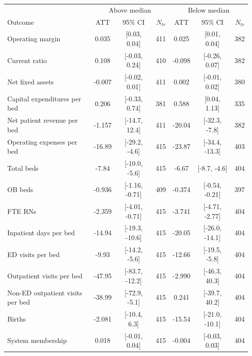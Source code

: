 \begin{tabular}{lccrccr}
 & \multicolumn{3}{c}{Above median} & \multicolumn{3}{c}{Below median} \\
Outcome & ATT & 95\% CI & $N_{tr}$ & ATT & 95\% CI & $N_{tr}$ \\
Operating margin & 0.035 & [0.03, 0.04] & 411 & 0.025 & [0.01, 0.04] & 382 \\
Current ratio & 0.108 & [-0.03, 0.24] & 410 & -0.098 & [-0.26, 0.07] & 382 \\
Net fixed assets & -0.007 & [-0.02, 0.01] & 411 & 0.002 & [-0.01, 0.02] & 380 \\
Capital expenditures per bed & 0.206 & [-0.33, 0.74] & 381 & 0.588 & [0.04, 1.13] & 335 \\
Net patient revenue per bed & -1.157 & [-14.7, 12.4] & 411 & -20.04 & [-32.3, -7.8] & 382 \\
Operating expenses per bed & -16.89 & [-29.2, -4.6] & 415 & -23.87 & [-34.4, -13.3] & 403 \\
Total beds & -7.84 & [-10.0, -5.6] & 415 & -6.67 & [-8.7, -4.6] & 404 \\
OB beds & -0.936 & [-1.16, -0.71] & 409 & -0.374 & [-0.54, -0.21] & 397 \\
FTE RNs & -2.359 & [-4.01, -0.71] & 415 & -3.741 & [-4.71, -2.77] & 404 \\
Inpatient days per bed & -14.94 & [-19.3, -10.6] & 415 & -20.05 & [-26.0, -14.1] & 404 \\
ED visits per bed & -9.93 & [-14.2, -5.6] & 415 & -12.66 & [-19.5, -5.8] & 404 \\
Outpatient visits per bed & -47.95 & [-83.7, -12.2] & 415 & -2.990 & [-46.3, 40.3] & 404 \\
Non-ED outpatient visits per bed & -38.99 & [-72.9, -5.1] & 415 & 0.241 & [-39.7, 40.2] & 404 \\
Births & -2.081 & [-10.4, 6.3] & 415 & -15.54 & [-21.0, -10.1] & 404 \\
System membership & 0.018 & [-0.01, 0.04] & 415 & -0.004 & [-0.03, 0.03] & 404 \\
\end{tabular}
